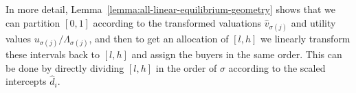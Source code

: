 In more detail, Lemma~\ref{lemma:all-linear-equilibrium-geometry} shows that we can partition $[0,1]$ according to the transformed valuations $\hat{v}_{\sigma(j)}$ and utility values $u_{\sigma(j)} / \Lambda_{\sigma(j)}$, and then to get an allocation of $[l,h]$ we linearly transform these intervals back to $[l,h]$ and assign the buyers in the same order. 
This can be done by directly dividing $[l,h]$ in the order of $\sigma$ according to the scaled intercepts $\hat{d}_i$.


